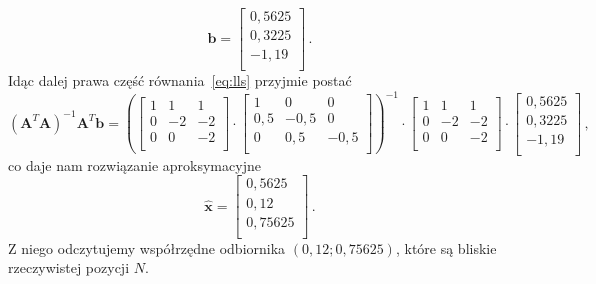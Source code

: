 \begin{equation*}
    \mathbf{b} =
    \left[
        \begin{matrix}
            0,5625\\
            0,3225\\
            -1,19\\
        \end{matrix}
    \right]\,.
\end{equation*}
Idąc dalej prawa część równania~\ref{eq:lls} przyjmie postać
\begin{equation*}
    {\left(\mathbf{A}^T\mathbf{A}\right)}^{-1}\mathbf{A}^T\mathbf{b} =
    {\left(
    \left[
        \begin{matrix}
            1 & 1 & 1\\
            0 & -2 & -2\\
            0 & 0 & -2\\
        \end{matrix}
    \right]
    \cdot
    \left[
        \begin{matrix}
            1 & 0 & 0\\
            0,5 & -0,5 & 0\\
            0 & 0,5 & -0,5\\
        \end{matrix}
    \right]
    \right)}^{-1}
    \cdot
    \left[
        \begin{matrix}
            1 & 1 & 1\\
            0 & -2 & -2\\
            0 & 0 & -2\\
        \end{matrix}
    \right]
    \cdot
    \left[
        \begin{matrix}
            0,5625\\
            0,3225\\
            -1,19\\
        \end{matrix}
    \right]\,,
\end{equation*}
co daje nam rozwiązanie aproksymacyjne
\begin{equation*}
    \hat{\mathbf{x}} =
    \left[
    \begin{matrix}
        0,5625\\
        0,12\\
        0,75625\\
    \end{matrix}
    \right]\,.
\end{equation*}
Z niego odczytujemy współrzędne odbiornika $(0,12;0,75625)$, które są bliskie rzeczywistej pozycji $N$.

